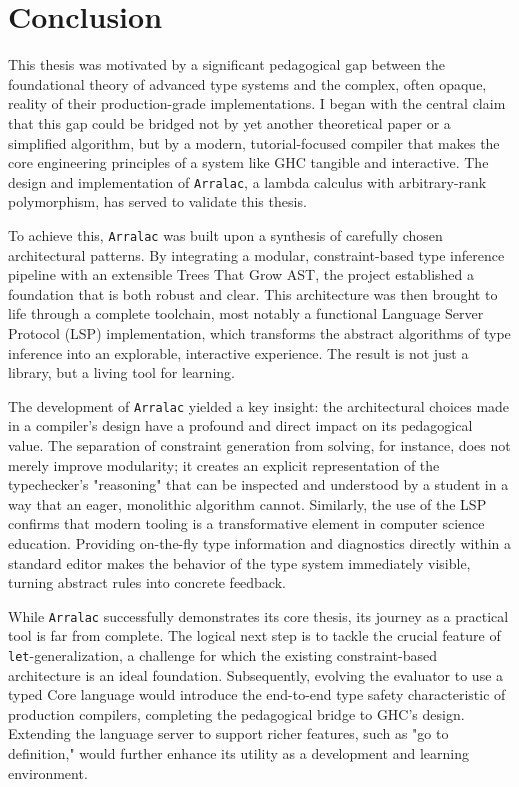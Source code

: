 \chapter{Conclusion}
\label{chap:Conclusion}

This thesis was motivated by a significant pedagogical gap between the foundational theory of advanced type systems and the complex, often opaque, reality of their production-grade implementations. I began with the central claim that this gap could be bridged not by yet another theoretical paper or a simplified algorithm, but by a modern, tutorial-focused compiler that makes the core engineering principles of a system like GHC tangible and interactive. The design and implementation of \texttt{Arralac}, a lambda calculus with arbitrary-rank polymorphism, has served to validate this thesis.

To achieve this, \texttt{Arralac} was built upon a synthesis of carefully chosen architectural patterns. By integrating a modular, constraint-based type inference pipeline with an extensible Trees That Grow AST, the project established a foundation that is both robust and clear. This architecture was then brought to life through a complete toolchain, most notably a functional Language Server Protocol (LSP) implementation, which transforms the abstract algorithms of type inference into an explorable, interactive experience. The result is not just a library, but a living tool for learning.

The development of \texttt{Arralac} yielded a key insight: the architectural choices made in a compiler's design have a profound and direct impact on its pedagogical value. The separation of constraint generation from solving, for instance, does not merely improve modularity; it creates an explicit representation of the typechecker's "reasoning" that can be inspected and understood by a student in a way that an eager, monolithic algorithm cannot. Similarly, the use of the LSP confirms that modern tooling is a transformative element in computer science education. Providing on-the-fly type information and diagnostics directly within a standard editor makes the behavior of the type system immediately visible, turning abstract rules into concrete feedback.

While \texttt{Arralac} successfully demonstrates its core thesis, its journey as a practical tool is far from complete. The logical next step is to tackle the crucial feature of \texttt{let}-generalization, a challenge for which the existing constraint-based architecture is an ideal foundation. Subsequently, evolving the evaluator to use a typed Core language would introduce the end-to-end type safety characteristic of production compilers, completing the pedagogical bridge to GHC's design. Extending the language server to support richer features, such as "go to definition," would further enhance its utility as a development and learning environment.

